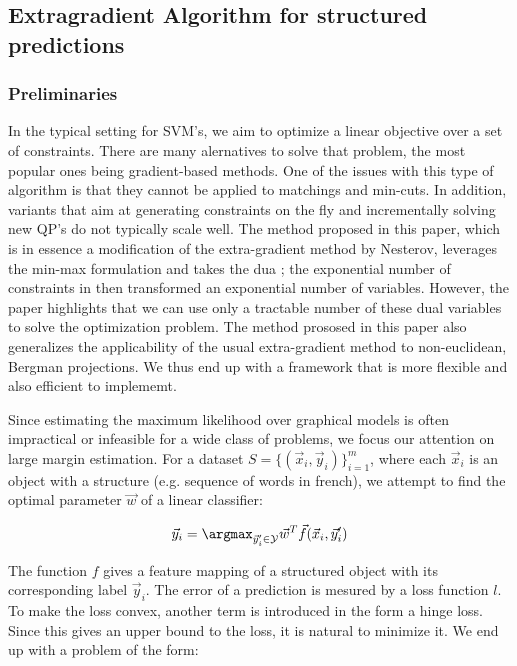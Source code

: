 \subsection{Extragradient Algorithm for structured predictions}
\subsubsection{Preliminaries}
In the typical setting for SVM's, we aim to optimize a linear objective over a
set of constraints. There are many alernatives to solve that problem, the most
popular ones being gradient-based methods. One of the issues with this type of
algorithm is that they cannot be applied to matchings and min-cuts. In addition,
variants that aim at generating constraints on the fly and incrementally solving
new QP's do not typically scale well. The method proposed in this paper, which
is in essence a modification of the extra-gradient method by Nesterov, leverages
the min-max formulation and takes the dua ; the exponential number of
constraints in then transformed an exponential number of variables. However, the
paper highlights that we can use only a tractable number of these dual variables
to solve the optimization problem. The method prososed in this paper also
generalizes the applicability of the usual extra-gradient method to
non-euclidean, Bergman projections. We thus end up with a framework that is more
flexible and also efficient to implememt.

Since estimating the maximum likelihood over graphical models is often
impractical or infeasible for a wide class of problems, we focus our attention
on large margin estimation. For a dataset $ S = \{ (\vec x_i, \vec y_i)
\}_{i=1}^{m} $, where each $\vec x_i$ is an object with a structure (e.g.
sequence of words in french), we attempt to find the optimal parameter $\vec w$
of a linear classifier:

\begin{equation}
  \vec y_i = \argmax_{\vec y_i' \in \mathcal{Y}} \vec w^T \vec f(\vec x_i,\vec y_i')
  \label{eq1}
\end{equation}

The function $f$ gives a feature mapping of a structured object with its
corresponding label $\vec y_i$. The error of a prediction is mesured by a loss
function $l$. To make the loss convex, another term is introduced in the form a
hinge loss. Since this gives an upper bound to the loss, it is natural to
minimize it. We end up with a problem of the form:

